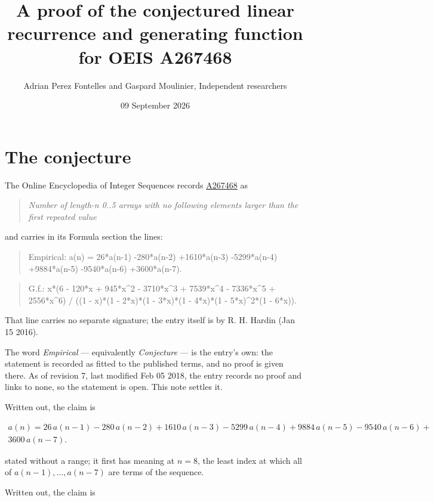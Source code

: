 \documentclass[11pt]{article}
\title{A proof of the conjectured linear recurrence and generating function for OEIS A267468}
\author{Adrian Perez Fontelles and Gaspard Moulinier, Independent researchers}
\date{09 September 2026}
\theoremstyle{definition}
\begin{document}
\maketitle
\section{The conjecture}

The Online Encyclopedia of Integer Sequences records \href{https://oeis.org/A267468}{A267468} as

\begin{quote}\itshape Number of length-n 0..5 arrays with no following elements larger than the first repeated value\end{quote}

and carries in its Formula section the lines:

\begin{quote}\ttfamily Empirical: a(n) = 26*a(n-1) -280*a(n-2) +1610*a(n-3) -5299*a(n-4) +9884*a(n-5) -9540*a(n-6) +3600*a(n-7).\end{quote}

\begin{quote}\ttfamily G.f.: x*(6 - 120*x + 945*x\textasciicircum{}2 - 3710*x\textasciicircum{}3 + 7539*x\textasciicircum{}4 - 7336*x\textasciicircum{}5 + 2556*x\textasciicircum{}6) / ((1 - x)*(1 - 2*x)*(1 - 3*x)*(1 - 4*x)*(1 - 5*x)\textasciicircum{}2*(1 - 6*x)).\end{quote}

That line carries no separate signature; the entry itself is by R. H. Hardin (Jan 15 2016).

The word {\itshape Empirical} --- equivalently {\itshape Conjecture} --- is the entry's own: the statement is recorded as fitted to the published terms, and no proof is given there. As of revision 7, last modified Feb 05 2018, the entry records no proof and links to none, so the statement is open. This note settles it.

Written out, the claim is

\begin{multline*} a(n) = 26\,a(n-1) - 280\,a(n-2) + 1610\,a(n-3) - 5299\,a(n-4) + 9884\,a(n-5) - 9540\,a(n-6) + \\ 3600\,a(n-7). \end{multline*}

stated without a range; it first has meaning at $n = 8$, the least index at which all of $a(n-1),\dots,a(n-7)$ are terms of the sequence.

Written out, the claim is
\end{document}
